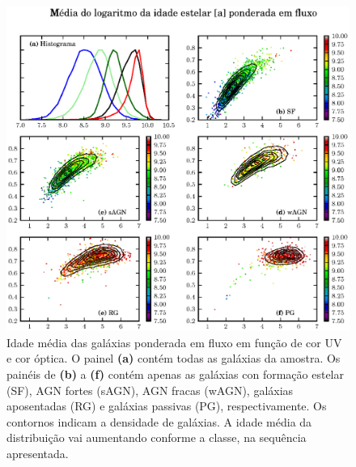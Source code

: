 \begin{figure}
	\includegraphics{figuras/uvcolor-color-at_flux-byclass.eps}
	\caption[Idade média das galáxias ponderada em fluxo no diagrama cor--cor UV.]
	{Idade média das galáxias ponderada em fluxo em função de cor UV e cor óptica.
	O painel {\bf (a)} contém todas as galáxias da amostra. Os painéis de {\bf (b)}
	a {\bf (f)} contém apenas as galáxias con formação estelar (SF), AGN fortes
	(sAGN), AGN fracas (wAGN), galáxias aposentadas (RG) e galáxias passivas (PG),
	respectivamente. Os contornos indicam a densidade de galáxias. A idade média
	da distribuição vai aumentando conforme a classe, na sequência apresentada.}
	\label{fig:ATFluxColor}
\end{figure}


